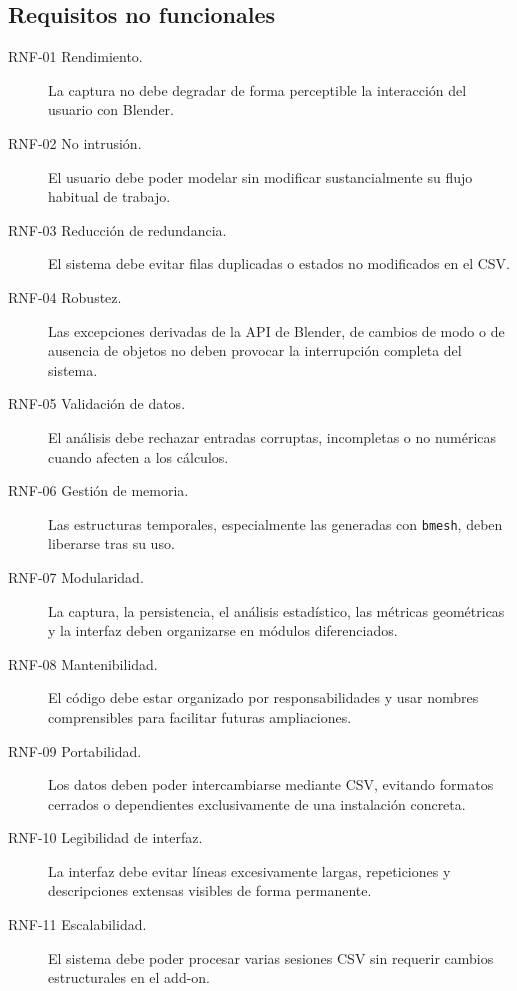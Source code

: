 \subsection{Requisitos no funcionales}

\begin{description}
    \item[RNF-01 Rendimiento.] La captura no debe degradar de forma perceptible la interacción del usuario con Blender.

    \item[RNF-02 No intrusión.] El usuario debe poder modelar sin modificar sustancialmente su flujo habitual de trabajo.

    \item[RNF-03 Reducción de redundancia.] El sistema debe evitar filas duplicadas o estados no modificados en el CSV.

    \item[RNF-04 Robustez.] Las excepciones derivadas de la API de Blender, de cambios de modo o de ausencia de objetos no deben provocar la interrupción completa del sistema.

    \item[RNF-05 Validación de datos.] El análisis debe rechazar entradas corruptas, incompletas o no numéricas cuando afecten a los cálculos.

    \item[RNF-06 Gestión de memoria.] Las estructuras temporales, especialmente las generadas con \texttt{bmesh}, deben liberarse tras su uso.

    \item[RNF-07 Modularidad.] La captura, la persistencia, el análisis estadístico, las métricas geométricas y la interfaz deben organizarse en módulos diferenciados.

    \item[RNF-08 Mantenibilidad.] El código debe estar organizado por responsabilidades y usar nombres comprensibles para facilitar futuras ampliaciones.

    \item[RNF-09 Portabilidad.] Los datos deben poder intercambiarse mediante CSV, evitando formatos cerrados o dependientes exclusivamente de una instalación concreta.

    \item[RNF-10 Legibilidad de interfaz.] La interfaz debe evitar líneas excesivamente largas, repeticiones y descripciones extensas visibles de forma permanente.

    \item[RNF-11 Escalabilidad.] El sistema debe poder procesar varias sesiones CSV sin requerir cambios estructurales en el add-on.


\end{description}
